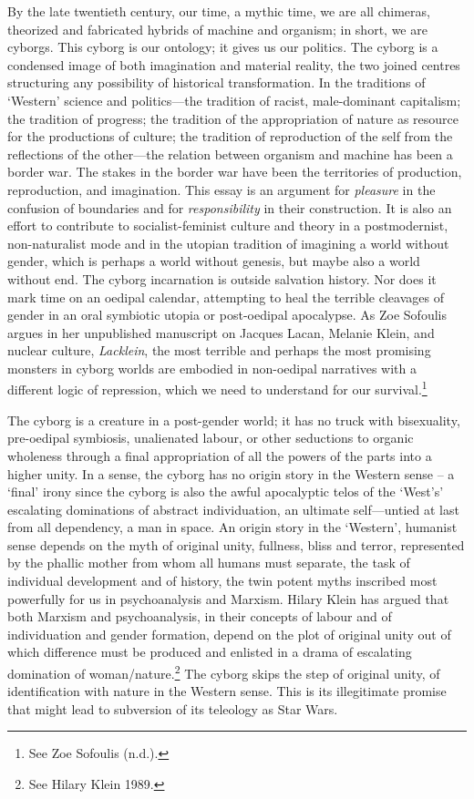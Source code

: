 \documentclass[DIV=12,%
               BCOR=10mm,%
               headinclude=false,%
               footinclude=false,open=any,%
               fontsize=11pt,%
               twoside,%
               paper=210mm:11in]%
               {scrbook}
\newcommand*{\Slash}{\slash\hspace{0pt}}
\begin{document}
By the late twentieth century, our time, a mythic time, we are all chimeras, theorized and fabricated hybrids of machine and organism; in short, we are cyborgs. This cyborg is our ontology; it gives us our politics. The cyborg is a condensed image of both imagination and material reality, the two joined centres structuring any possibility of historical transformation. In the traditions of ‘Western’ science and politics—the tradition of racist, male-dominant capitalism; the tradition of progress; the tradition of the appropriation of nature as resource for the productions of culture; the tradition of reproduction of the self from the reflections of the other—the relation between organism and machine has been a border war. The stakes in the border war have been the territories of production, reproduction, and imagination. This essay is an argument for \emph{pleasure} in the confusion of boundaries and for \emph{responsibility} in their construction. It is also an effort to contribute to socialist-feminist culture and theory in a postmodernist, non-naturalist mode and in the utopian tradition of imagining a world without gender, which is perhaps a world without genesis, but maybe also a world without end. The cyborg incarnation is outside salvation history. Nor does it mark time on an oedipal calendar, attempting to heal the terrible cleavages of gender in an oral symbiotic utopia or post-oedipal apocalypse. As Zoe Sofoulis argues in her unpublished manuscript on Jacques Lacan, Melanie Klein, and nuclear culture, \emph{Lacklein}, the most terrible and perhaps the most promising monsters in cyborg worlds are embodied in non-oedipal narratives with a different logic of repression, which we need to understand for our survival.\footnote{See Zoe Sofoulis (n.d.).}


The cyborg is a creature in a post-gender world; it has no truck with bisexuality, pre-oedipal symbiosis, unalienated labour, or other seductions to organic wholeness through a final appropriation of all the powers of the parts into a higher unity. In a sense, the cyborg has no origin story in the Western sense – a ‘final’ irony since the cyborg is also the awful apocalyptic telos of the ‘West’s’ escalating dominations of abstract individuation, an ultimate self—untied at last from all dependency, a man in space. An origin story in the ‘Western’, humanist sense depends on the myth of original unity, fullness, bliss and terror, represented by the phallic mother from whom all humans must separate, the task of individual development and of history, the twin potent myths inscribed most powerfully for us in psychoanalysis and Marxism. Hilary Klein has argued that both Marxism and psychoanalysis, in their concepts of labour and of individuation and gender formation, depend on the plot of original unity out of which difference must be produced and enlisted in a drama of escalating domination of woman\Slash{}nature.\footnote{See Hilary Klein 1989.} The cyborg skips the step of original unity, of identification with nature in the Western sense. This is its illegitimate promise that might lead to subversion of its teleology as Star Wars.
\end{document}
